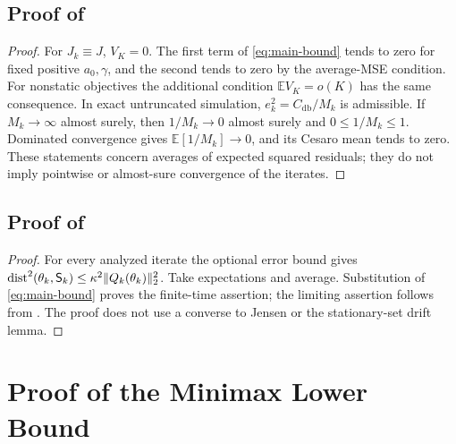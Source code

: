 \documentclass[11pt]{article}
\newcommand{\E}{\mathbb E}
\newcommand{\1}{\mathbf 1}
\newcommand{\dist}{\operatorname{dist}}
\DeclarePairedDelimiter{\norm}{\lVert}{\rVert}
\newcommand{\Sta}{\mathsf S}
\newcommand{\db}{\mathrm{db}}
\begin{document}
\subsection{Proof of \texorpdfstring{}{the static-limit corollary}}
\begin{proof}
For $J_k\equiv J$, $V_K=0$. The first term of \eqref{eq:main-bound} tends to zero for fixed positive $a_0,\gamma$, and the second tends to zero by the average-MSE condition. For nonstatic objectives the additional condition $\E V_K=o(K)$ has the same consequence. In exact untruncated simulation, $e_k^2=C_{\db}/M_k$ is admissible. If $M_k\to\infty$ almost surely, then $1/M_k\to0$ almost surely and $0\le1/M_k\le1$. Dominated convergence gives $\E[1/M_k]\to0$, and its Cesaro mean tends to zero. These statements concern averages of expected squared residuals; they do not imply pointwise or almost-sure convergence of the iterates.
\end{proof}

\subsection{Proof of \texorpdfstring{}{the set-tracking corollary}}
\begin{proof}
For every analyzed iterate the optional error bound gives
$\dist^2(\theta_k,\Sta_k)\le\kappa^2\norm{Q_k(\theta_k)}_2^2$.
Take expectations and average. Substitution of \eqref{eq:main-bound} proves the finite-time assertion; the limiting assertion follows from . The proof does not use a converse to Jensen or the stationary-set drift lemma.
\end{proof}

\section{Proof of the Minimax Lower Bound}\label{app:minimax-proof}
\end{document}
